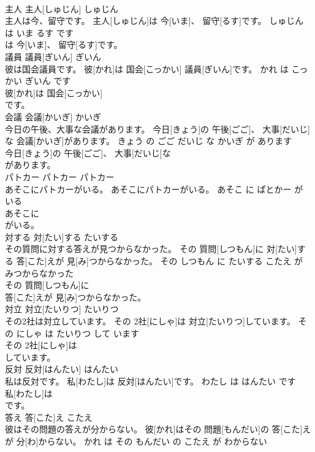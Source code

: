 \documentclass[8pt]{extreport}
\begin{document}
\begin{CJK}{UTF8}{min}
\\	主人	主人[しゅじん]	しゅじん	
\\	主人は今、留守です。	主人[しゅじん]は 今[いま]、 留守[るす]です。	しゅじん は いま るす です	
\\	は 今[いま]、 留守[るす]です。		
\\	議員	議員[ぎいん]	ぎいん	
\\	彼は国会議員です。	彼[かれ]は 国会[こっかい] 議員[ぎいん]です。	かれ は こっかい ぎいん です	
\\	彼[かれ]は 国会[こっかい]
\\	です。		
\\	会議	会議[かいぎ]	かいぎ	
\\	今日の午後、大事な会議があります。	今日[きょう]の 午後[ごご]、 大事[だいじ]な 会議[かいぎ]があります。	きょう の ごご だいじ な かいぎ が あります	
\\	今日[きょう]の 午後[ごご]、 大事[だいじ]な
\\	があります。		
\\	パトカー	パトカー	パトカー	
\\	あそこにパトカーがいる。	あそこにパトカーがいる。	あそこ に ぱとかー が いる	
\\	あそこに
\\	がいる。		
\\	対する	対[たい]する	たいする	
\\	その質問に対する答えが見つからなかった。	その 質問[しつもん]に 対[たい]する 答[こた]えが 見[み]つからなかった。	その しつもん に たいする こたえ が みつからなかった	
\\	その 質問[しつもん]に
\\	答[こた]えが 見[み]つからなかった。		
\\	対立	対立[たいりつ]	たいりつ	
\\	その2社は対立しています。	その 2社[にしゃ]は 対立[たいりつ]しています。	その にしゃ は たいりつ して います	
\\	その 2社[にしゃ]は
\\	しています。		
\\	反対	反対[はんたい]	はんたい	
\\	私は反対です。	私[わたし]は 反対[はんたい]です。	わたし は はんたい です	
\\	私[わたし]は
\\	です。		
\\	答え	答[こた]え	こたえ	
\\	彼はその問題の答えが分からない。	彼[かれ]はその 問題[もんだい]の 答[こた]えが 分[わ]からない。	かれ は その もんだい の こたえ が わからない	

\end{CJK}
\end{document}

